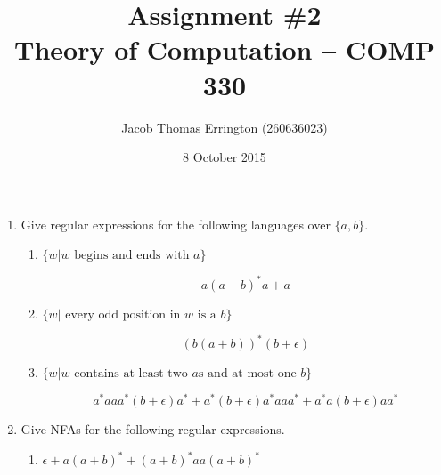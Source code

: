\documentclass[letterpaper,11pt]{article}
\author{Jacob Thomas Errington (260636023)}
\title{Assignment \#2 \\ Theory of Computation -- COMP 330}
\date{8 October 2015}
\begin{document}
\maketitle

\begin{enumerate}
    \item
        Give regular expressions for the following languages over $\{a, b\}$.

        \begin{enumerate}
            \item $\{w | w \text{ begins and ends with } a\}$

                $$
                a(a + b)^*a + a
                $$

            \item $\{w | \text{ every odd position in $w$ is a } b\}$

                $$
                (b(a + b))^*(b + \epsilon)
                $$

            \item
                $\{w | w \text{ contains at least two $a$s and at most one $b$}\}$

                $$
                a^*aaa^*(b+\epsilon)a^* +
                a^*(b+\epsilon)a^*aaa^* +
                a^*a(b+\epsilon)aa^*
                $$
        \end{enumerate}

    \item
        Give NFAs for the following regular expressions.

        \begin{enumerate}
            \item
                $\epsilon + a(a + b)^* + (a + b)^*aa(a + b)^*$

                \begin{figure}[H]
                    \centering

\end{figure}
\end{enumerate}
\end{enumerate}
\end{document}
